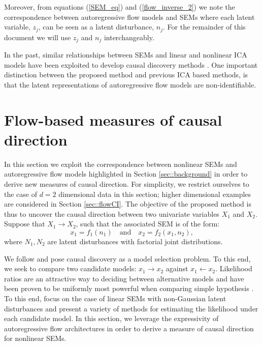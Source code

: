 \documentclass[]{article}
\begin{document}
Moreover, 
from equations (\ref{SEM_eq}) and (\ref{flow_inverse_2}) we note the correspondence between 
autoregressive flow models and SEMs where each latent variable, $z_j$, can be 
seen as a latent disturbance, $n_j$.  
For the remainder of this document we will use $z_j$ and $n_j$ interchangeably. 

In the past, similar relationships between SEMs and linear and nonlinear ICA 
models have been exploited to develop causal discovery 
methods \citep{Shimizu2006, monti2019causal}. One important distinction between 
the proposed method and previous ICA based methods, is that the latent representations of 
autoregressive flow models are non-identifiable. 












\section{Flow-based measures of causal direction}
\label{sec::flowCD}

In this section we exploit the correspondence between nonlinear SEMs 
and 
autoregressive flow models highlighted in 
Section \ref{sec::background} in order to derive new measures of causal direction. 
For simplicity, we restrict ourselves to the case of $d=2$ dimensional data in this section; higher 
dimensional examples are considered in Section \ref{sec::flowCI}. 
%
The objective of the 
proposed method is thus to uncover the causal direction between two univariate variables 
${X}_1$ and ${X}_2$. 
Suppose that ${X}_1 \rightarrow {X}_2$, such that 
the associated SEM is of the form:
\begin{equation}
{x}_1 = f_1( n_1 ) ~~~ \mbox{ and } ~~~ {x}_2 = f_2({x}_1, n_2),
\label{bivariate_eq2}
\end{equation}
where $N_1, N_2$ are %
latent disturbances with factorial joint distributions. 

We follow \cite{Hyvarinen2013} 
and pose causal discovery as a model selection problem. To this end, we seek to compare
two candidate models: $x_1 \rightarrow x_2$ against $x_1 \leftarrow x_2$. 
Likelihood ratios are an attractive way to deciding between alternative models 
and have been proven to be uniformly most powerful when comparing simple hypothesis \citep{neyman1933ix}.
To this end, \cite{Hyvarinen2013} focus on the case of linear SEMs with non-Gaussian latent disturbances and present a variety of methods for estimating the likelihood under each candidate model. 
In this section, we leverage the expressivity of autoregressive flow architectures in order to 
derive a measure of causal direction for nonlinear SEMs. 
\end{document}
